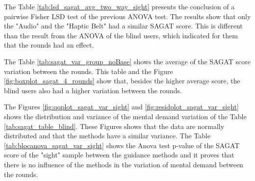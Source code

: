 The Table \ref{tab:lsd_sagat_avg_two_way_sight} presents the conclusion of a pairwise Fisher LSD test of the previous ANOVA test. The results show that only the "Audio" and the "Haptic Belt" had a similar SAGAT score. This is different than the result from the ANOVA of the blind users, which indicated for them that the rounds had an effect.



The Table \ref{tab:sagat_var_group_noBase} shows the average of the SAGAT score variation between the rounds. This table and the Figure \ref{fig:boxplot_sagat_4_rounds} show that, besides the higher average score, the blind users also had a higher variation between the rounds.



The Figures \ref{fig:qqplot_sagat_var_sight} and \ref{fig:residplot_sagat_var_sight} shows the distribution and variance of the mental demand variation of the Table \ref{tab:sagat_table_blind}. These Figures shows that the data are normally distributed and that the methods have a similar variance.
The Table \ref{tab:blocanova_sagat_var_sight} shows the Anova test p-value of the SAGAT score of the "sight" sample between the guidance methods and it proves that there is no influence of the methods in the variation of mental demand between the rounds. 



